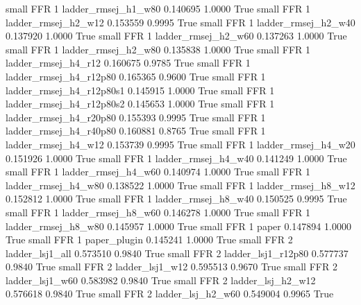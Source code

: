      small      FFR                 1      ladder_rmsej_h1_w80   0.140695      1.0000    True
     small      FFR                 1      ladder_rmsej_h2_w12   0.153559      0.9995    True
     small      FFR                 1      ladder_rmsej_h2_w40   0.137920      1.0000    True
     small      FFR                 1      ladder_rmsej_h2_w60   0.137263      1.0000    True
     small      FFR                 1      ladder_rmsej_h2_w80   0.135838      1.0000    True
     small      FFR                 1      ladder_rmsej_h4_r12   0.160675      0.9785    True
     small      FFR                 1   ladder_rmsej_h4_r12p80   0.165365      0.9600    True
     small      FFR                 1 ladder_rmsej_h4_r12p80s1   0.145915      1.0000    True
     small      FFR                 1 ladder_rmsej_h4_r12p80s2   0.145653      1.0000    True
     small      FFR                 1   ladder_rmsej_h4_r20p80   0.155393      0.9995    True
     small      FFR                 1   ladder_rmsej_h4_r40p80   0.160881      0.8765    True
     small      FFR                 1      ladder_rmsej_h4_w12   0.153739      0.9995    True
     small      FFR                 1      ladder_rmsej_h4_w20   0.151926      1.0000    True
     small      FFR                 1      ladder_rmsej_h4_w40   0.141249      1.0000    True
     small      FFR                 1      ladder_rmsej_h4_w60   0.140974      1.0000    True
     small      FFR                 1      ladder_rmsej_h4_w80   0.138522      1.0000    True
     small      FFR                 1      ladder_rmsej_h8_w12   0.152812      1.0000    True
     small      FFR                 1      ladder_rmsej_h8_w40   0.150525      0.9995    True
     small      FFR                 1      ladder_rmsej_h8_w60   0.146278      1.0000    True
     small      FFR                 1      ladder_rmsej_h8_w80   0.145957      1.0000    True
     small      FFR                 1                    paper   0.147894      1.0000    True
     small      FFR                 1             paper_plugin   0.145241      1.0000    True
     small      FFR                 2          ladder_lsj1_all   0.573510      0.9840    True
     small      FFR                 2       ladder_lsj1_r12p80   0.577737      0.9840    True
     small      FFR                 2          ladder_lsj1_w12   0.595513      0.9670    True
     small      FFR                 2          ladder_lsj1_w60   0.583982      0.9840    True
     small      FFR                 2        ladder_lsj_h2_w12   0.576618      0.9840    True
     small      FFR                 2        ladder_lsj_h2_w60   0.549004      0.9965    True
